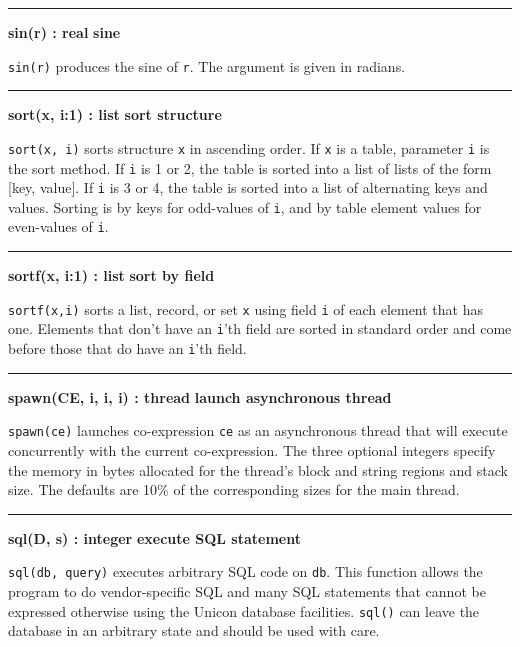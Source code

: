 \bigskip\hrule\vspace{0.1cm}
\noindent
{\bf sin(r) : real } \hfill {\bf sine}

\noindent
{}\texttt{sin(r)} produces the sine of
\texttt{r}. The argument is given in radians.

\bigskip\hrule\vspace{0.1cm}
\noindent
{\bf sort(x, i:1) : list } \hfill {\bf sort structure}

\noindent
{}\texttt{sort(x, i)} sorts structure \texttt{x} in
ascending order. If
\texttt{x} is a table, parameter \texttt{i} is the sort method. If
\texttt{i} is 1 or 2, the table is sorted into a list of lists of the
form [key, value]. If \texttt{i} is 3 or 4, the table is sorted into a
list of alternating keys and values. Sorting is by keys for odd-values
of \texttt{i}, and by table element values for even-values of
\texttt{i}.

\bigskip\hrule\vspace{0.1cm}
\noindent
{\bf sortf(x, i:1) : list } \hfill {\bf sort by field}

\noindent
{}\texttt{sortf(x,i)} sorts a list, record, or set
\texttt{x} using field \texttt{i} of each element that has one.
Elements that don't have an
\texttt{i}'th field are sorted in standard order and
come before those that do have an \texttt{i}'th field.

\bigskip\hrule\vspace{0.1cm}
\noindent
{\bf spawn(CE, i, i, i) : thread } \hfill {\bf launch asynchronous thread}

\noindent
{}\texttt{spawn(ce)} launches co-expression \texttt{ce} as an
asynchronous thread that will execute concurrently with the current
co-expression. The three optional integers specify the memory in bytes
allocated for the thread's block and string regions and stack size.
The defaults are 10\% of the corresponding sizes for the main thread.

\bigskip\hrule\vspace{0.1cm}
\noindent
{\bf sql(D, s) : integer } \hfill {\bf execute SQL statement}

\noindent
{}\texttt{sql(db, query)} executes arbitrary SQL code on
\texttt{db}. This function allows the program to do vendor-specific SQL
and many SQL statements that cannot be expressed otherwise using the
Unicon database facilities. \texttt{sql()} can leave the database in an
arbitrary state and should be used with care.

